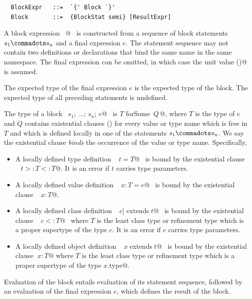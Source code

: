 \syntax\begin{lstlisting}
  BlockExpr   ::=  `{' Block `}'
  Block       ::=  {BlockStat semi} [ResultExpr]
\end{lstlisting}

A block expression ~@~ is
constructed from a sequence of block statements $s_1 \commadots s_n$
and a final expression $e$.  The statement sequence may not contain
two definitions or declarations that bind the same name in the same
namespace.  The final expression can be omitted, in which
case the unit value \lstinline@()@ is assumed.


The expected type of the final expression $e$ is the expected
type of the block. The expected type of all preceding statements is
undefined.

The type of a block ~\lstinline@$s_1$; $\ldots$; $s_n$; $e$@~ is
\lstinline@$T$ forSome {$\,Q\,$}@, where $T$ is the type of $e$ and $Q$ 
contains existential clauses ()
for every value or type name which is free in $T$ 
and which is defined locally in one of the statements $s_1 \commadots s_n$.
We say the existential clause {\em binds} the occurrence of the value or type name.
Specifically, 
\begin{itemize}
\item
A locally defined type definition  ~\lstinline@type$\;t = T$@~
is bound by the existential clause ~\lstinline@type$\;t >: T <: T$@.
It is an error if $t$ carries type parameters. 
\item
A locally defined value definition~ \lstinline@val$\;x: T = e$@~ is
bound by the existential clause ~\lstinline@val$\;x: T$@.
\item
A locally defined class definition ~\lstinline@class$\;c$] extends$\;t$@~
is bound by the existential clause ~\lstinline@type$\;c <: T$@~ where
$T$ is the least class type or refinement type which is a proper
supertype of the type $c$. It is an error if $c$ carries type parameters. 
\item
A locally defined object definition ~\lstinline@object$\;x\;$extends$\;t$@~
is bound by the existential clause \lstinline@val$\;x: T$@ where
$T$ is the least class type or refinement type which is a proper supertype of the type 
\lstinline@$x$.type@.
\end{itemize}
Evaluation of the block entails evaluation of its
statement sequence, followed by an evaluation of the final expression
$e$, which defines the result of the block.

